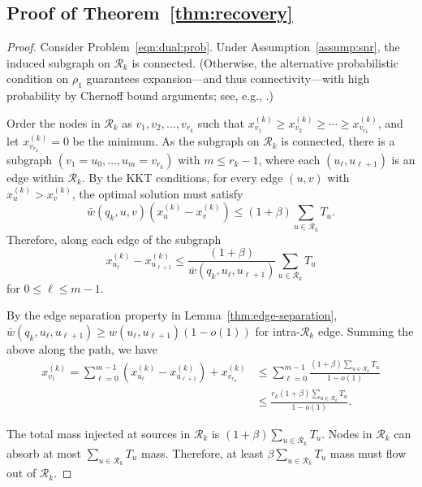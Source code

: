 \documentclass{article} %
\begin{document}
\subsection{Proof of Theorem~\ref{thm:recovery}}
\begin{proof}
Consider Problem~\eqref{eqn:dual:prob}. Under Assumption~\ref{assump:snr}, the induced subgraph on $\mathcal{R}_k$ is connected. (Otherwise, the alternative probabilistic condition on $\rho_1$ guarantees expansion—and thus connectivity—with high probability by Chernoff bound arguments; see, e.g., \cite[Lemma C.1]{yang2023weighted}.)

Order the nodes in $\mathcal{R}_k$ as $v_1, v_2, \ldots, v_{r_k}$ such that $x_{v_1}^{(k)} \geq x_{v_2}^{(k)} \geq \cdots \geq x_{v_{r_k}}^{(k)}$, and let $x_{v_{r_k}}^{(k)} = 0$ be the minimum.
As the subgraph on $\mathcal{R}_k$ is connected, there is a subgraph $ (v_1 = u_0,  \ldots, u_m = v_{r_k})$ with $m \leq r_k - 1$, where each $(u_\ell, u_{\ell+1})$ is an edge within $\mathcal{R}_k$. By the KKT conditions, for every edge $(u,v)$ with  $x_u^{(k)} > x_v^{(k)}$, the optimal solution must satisfy
\[
    \bar{w}(q_k, u, v) (x_u^{(k)} - x_v^{(k)}) \leq (1+\beta)\sum_{u \in \mathcal{R}_k} T_u.
\]
Therefore, along each edge of the subgraph
\[
    x_{u_\ell}^{(k)} - x_{u_{\ell+1}}^{(k)} \leq \frac{(1+\beta)}{\bar{w}(q_k, u_\ell, u_{\ell+1})} \sum_{u \in \mathcal{R}_k} T_u
\]
for $0 \leq \ell \leq m-1$. 

By the edge separation property in Lemma~\ref{thm:edge-separation}, $\bar{w}(q_k, u_\ell, u_{\ell+1}) \geq w(u_\ell, u_{\ell+1})(1-o(1))$ for intra-$\mathcal{R}_k$ edge. Summing the above along the path, we have
\begin{align}
\nonumber
    x_{v_1}^{(k)} = \sum_{\ell=0}^{m-1} (x_{u_\ell}^{(k)} - x_{u_{\ell+1}}^{(k)}) + x_{v_{r_k}}^{(k)} &\leq \sum_{\ell=0}^{m-1} \frac{(1+\beta)\sum_{u \in \mathcal{R}_k} T_u}{1 - o(1)}\\
    &\leq \frac{r_k(1+\beta)\sum_{u \in \mathcal{R}_k} T_u}{1 - o(1)}.
\end{align}

The total mass injected at sources in $\mathcal{R}_k$ is $(1+\beta)\sum_{u \in \mathcal{R}_k} T_u$. Nodes in $\mathcal{R}_k$ can absorb at most $\sum_{u \in \mathcal{R}_k} T_u$ mass. Therefore, at least $\beta\sum_{u \in \mathcal{R}_k} T_u$ mass must flow out of $\mathcal{R}_k$.


\end{proof}
\end{document}
